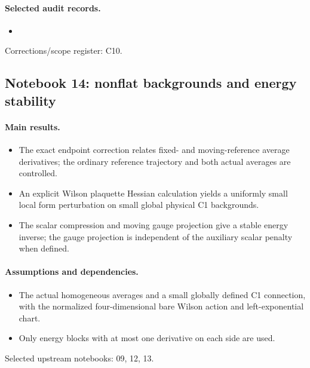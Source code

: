 \documentclass[11pt]{article}
\theoremstyle{remark}
\begin{document}
\paragraph{Selected audit records.}
\begingroup\small
\begin{itemize}
\item {}
\end{itemize}
\endgroup
Corrections/scope register: C10.\par

\subsection{Notebook 14: nonflat backgrounds and energy stability}
\label{hnc-14}
\noindent{}\par

\paragraph{Main results.}
\begin{itemize}
\item The exact endpoint correction relates fixed- and moving-reference average derivatives; the ordinary reference trajectory and both actual averages are controlled.
\item An explicit Wilson plaquette Hessian calculation yields a uniformly small local form perturbation on small global physical C1 backgrounds.
\item The scalar compression and moving gauge projection give a stable energy inverse; the gauge projection is independent of the auxiliary scalar penalty when defined.
\end{itemize}

\paragraph{Assumptions and dependencies.}
\begin{itemize}
\item The actual homogeneous averages and a small globally defined C1 connection, with the normalized four-dimensional bare Wilson action and left-exponential chart.
\item Only energy blocks with at most one derivative on each side are used.
\end{itemize}

Selected upstream notebooks: 09, 12, 13.\par
\end{document}
